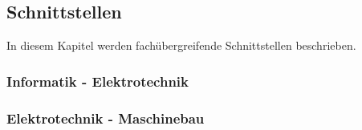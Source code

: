 \subsection{Schnittstellen}
In diesem Kapitel werden fachübergreifende Schnittstellen beschrieben.

\subsubsection{Informatik - Elektrotechnik}

\subsubsection{Elektrotechnik - Maschinebau}